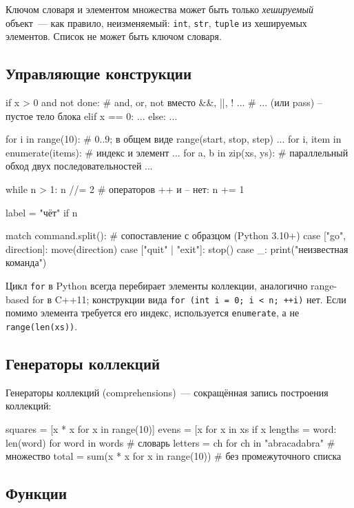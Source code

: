 \documentclass[11pt,a4paper]{article}
\newcommand{\code}[1]{\texttt{#1}}
\begin{document}
Ключом словаря и элементом множества может быть только \emph{хешируемый} объект~— как правило,
неизменяемый: \code{int}, \code{str}, \code{tuple} из хешируемых элементов. Список не может
быть ключом словаря.

\subsection{Управляющие конструкции}

\begin{py}
if x > 0 and not done:          # and, or, not вместо &&, ||, !
    ...                         # ... (или pass) -- пустое тело блока
elif x == 0:
    ...
else:
    ...

for i in range(10):             # 0..9; в общем виде range(start, stop, step)
    ...
for i, item in enumerate(items):    # индекс и элемент
    ...
for a, b in zip(xs, ys):        # параллельный обход двух последовательностей
    ...

while n > 1:
    n //= 2                     # операторов ++ и -- нет: n += 1

label = "чёт" if n %

match command.split():          # сопоставление с образцом (Python 3.10+)
    case ["go", direction]:
        move(direction)
    case ["quit" | "exit"]:
        stop()
    case _:
        print("неизвестная команда")
\end{py}

Цикл \code{for} в Python всегда перебирает элементы коллекции, аналогично range-based for
в C++11; конструкции вида \code{for (int i = 0; i < n; ++i)} нет. Если помимо элемента требуется
его индекс, используется \code{enumerate}, а не \code{range(len(xs))}.

\subsection{Генераторы коллекций}

Генераторы коллекций (comprehensions)~— сокращённая запись построения коллекций:
\begin{py}
squares = [x * x for x in range(10)]
evens   = [x for x in xs if x %
lengths = {word: len(word) for word in words}       # словарь
letters = {ch for ch in "abracadabra"}              # множество
total   = sum(x * x for x in range(10))             # без промежуточного списка
\end{py}

\subsection{Функции}
\end{document}
